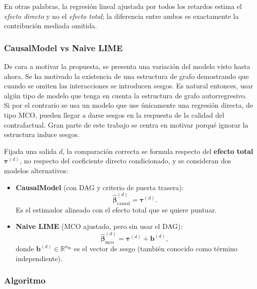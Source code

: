 \documentclass[12pt]{report} %
\begin{document}
En otras palabras, la regresión lineal ajustada por todos los retardos estima el \emph{efecto directo} y no el \emph{efecto total}; la diferencia entre ambos es exactamente la contribución mediada omitida.

\subsubsection{CausalModel vs Naive LIME}

De cara a motivar la propuesta, se presenta una variación del modelo visto hasta ahora. Se ha motivado la existencia de una estructura de grafo demostrando que cuando se omiten las interacciones se introducen sesgos. Es natural entonces, usar algún tipo de modelo que tenga en cuenta la estructura de grafo autorregresivo. Si por el contrario se usa un modelo que use únicamente una regresión directa, de tipo MCO, pueden llegar a darse sesgos en la respuesta de la calidad del contrafactual. Gran parte de este trabajo se centra en motivar porqué ignorar la estructura induce sesgos.

Fijada una salida $d$, la comparación correcta se formula respecto del \textbf{efecto total} $\boldsymbol{\tau}^{(d)}$, no respecto del coeficiente directo condicionado, y se consideran dos modelos alternativos:
\begin{itemize}
    \item \textbf{CausalModel} (con DAG y criterio de puerta trasera):
          $$\widehat{\boldsymbol{\beta}}_{\text{causal}}^{(d)} = \boldsymbol{\tau}^{(d)}.$$
          Es el estimador alineado con el efecto total que se quiere puntuar.
    \item \textbf{Naive LIME} (MCO ajustado, pero sin usar el DAG):
          $$\widehat{\boldsymbol{\beta}}_{\text{mco}}^{(d)} = \boldsymbol{\tau}^{(d)} + \mathbf{b}^{(d)},$$
          donde $\mathbf{b}^{(d)} \in \mathbb{R}^{n_{\text{In}}}$ es el vector de sesgo (también conocido como término independiente).
\end{itemize}

\subsubsection{Algoritmo}
\end{document}
